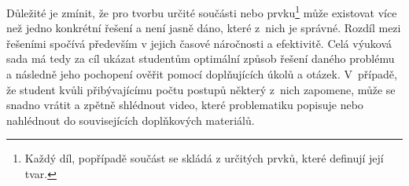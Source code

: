 Důležité je zmínit, že pro tvorbu určité součásti nebo prvku\footnote{Každý díl, popřípadě součást se skládá z určitých prvků, které definují její tvar.} může existovat více než jedno konkrétní řešení a není jasně dáno, které z~nich je správné.
Rozdíl mezi řešeními spočívá především v jejich časové náročnosti a efektivitě.
Celá výuková sada má tedy za cíl ukázat studentům optimální způsob řešení daného problému a následně jeho pochopení ověřit pomocí doplňujících úkolů a otázek.
V~případě, že student kvůli přibývajícímu počtu postupů některý z~nich zapomene, může se snadno vrátit a zpětně shlédnout video, které problematiku popisuje nebo nahlédnout do souvisejících doplňkových materiálů.

\newpage
